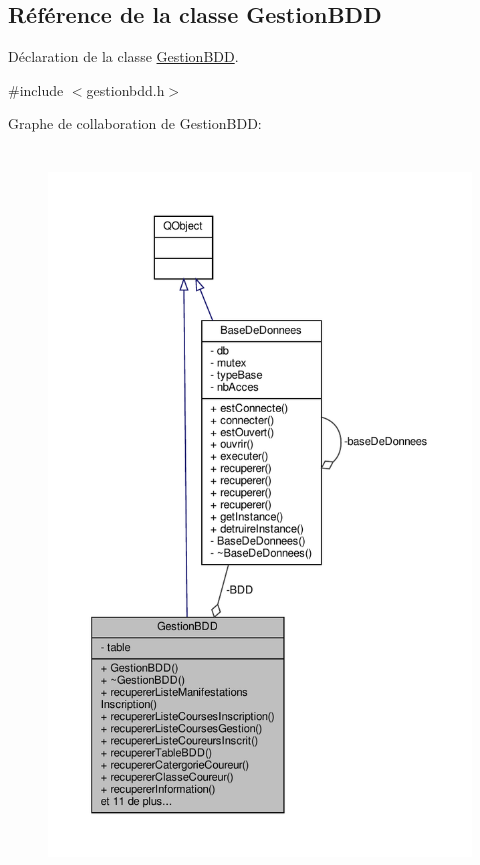 \hypertarget{class_gestion_b_d_d}{}\subsection{Référence de la classe Gestion\+B\+DD}
\label{class_gestion_b_d_d}


Déclaration de la classe \hyperlink{class_gestion_b_d_d}{Gestion\+B\+DD}.  




{\ttfamily \#include $<$gestionbdd.\+h$>$}



Graphe de collaboration de Gestion\+B\+DD\+:\nopagebreak
\begin{figure}[H]
\begin{center}
\leavevmode
\includegraphics[height=550pt]{class_gestion_b_d_d__coll__graph}
\end{center}
\end{figure}
